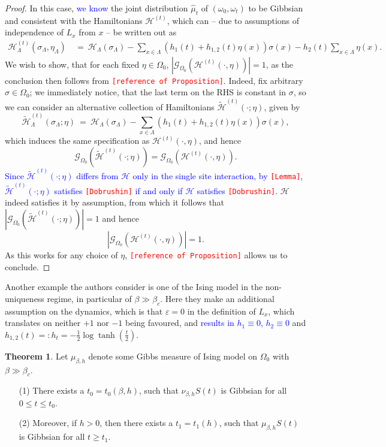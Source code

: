 \documentclass[12pt]{article}
\newcommand{\G}{\mathcal{G}}
\renewcommand{\H}{\mathcal{H}}
\newcommand{\oklepaj}[1]{\left(#1\right)}
\newcommand{\pika}{\boldsymbol{\cdot}}
\newcommand{\1}{\mathbbm{1}}
\newcommand{\5}{\vspace{0.5cm}}
\renewcommand{\tilde}{\widetilde}
\renewcommand{\hat}{\widehat}
\theoremstyle{definition}
\newtheorem{thm}{Theorem}[section]
\begin{document}
\begin{proof}
In this case, \textcolor{blue}{we know} the joint distribution $\hat{\mu}_t$ of $(\omega_0,\omega_t)$ to be Gibbsian and consistent with the Hamiltonians $\H^{(t)}$, which can -- due to assumptions of independence of $L_x$ from $x$ -- be written out as
\begin{align*}
\H_\Lambda^{(t)}(\sigma_\Lambda,\eta_\Lambda) ~&=~ \H_\Lambda(\sigma_\Lambda) - \sum_{x\in\Lambda}\oklepaj{h_1(t)+h_{1,2}(t)\eta(x)}\sigma(x) - h_2(t)\sum_{x\in\Lambda}\eta(x).
\end{align*}
We wish to show, that for each fixed $\eta\in\Omega_0$, $|\G_{\Omega_0}(\H^{(t)}(\pika,\eta))|=1$, as the conclusion then follows from \textcolor{red}{\texttt{[reference of Proposition]}}. Indeed, fix arbitrary $\sigma\in\Omega_0$; we immediately notice, that the last term on the RHS is constant in $\sigma$, so we can consider an alternative collection of Hamiltonians $\tilde{\H}^{(t)}(\pika;\eta)$, given by
$$\tilde{\H}_\Lambda^{(t)}(\sigma_\Lambda;\eta) ~=~ \H_\Lambda(\sigma_\Lambda) - \sum_{x\in\Lambda}\oklepaj{h_1(t)+h_{1,2}(t)\eta(x)}\sigma(x),$$
which induces the same specification as $\H^{(t)}(\pika,\eta)$, and hence 
$$\G_{\Omega_0}(\tilde{\H}^{(t)}(\pika;\eta))=\G_{\Omega_0}(\H^{(t)}(\pika,\eta)).$$
\textcolor{blue}{Since $\tilde{\H}^{(t)}(\pika;\eta)$ differs from $\H$ only in the single site interaction, by \textcolor{red}{\texttt{[Lemma]}}, $\tilde{\H}^{(t)}(\pika;\eta)$ satisfies \textcolor{red}{\texttt{[Dobrushin]}} if and only if $\H$ satisfies \textcolor{red}{\texttt{[Dobrushin]}}}. $\H$ indeed satisfies it by assumption, from which it follows that $|\G_{\Omega_0}(\tilde{\H}^{(t)}(\pika;\eta))|=1$ and hence 
$$|\G_{\Omega_0}(\H^{(t)}(\pika,\eta))|=1.$$
As this works for any choice of $\eta$, \textcolor{red}{\texttt{[reference of Proposition]}} allows us to conclude.
\end{proof}

Another example the authors consider is one of the Ising model in the non-uniqueness regime, in particular of $\beta\gg\beta_c$. Here they make an additional assumption on the dynamics, which is that $\varepsilon=0$ in the definition of $L_x$, which translates on neither $+1$ nor $-1$ being favoured, and \textcolor{blue}{results in $h_1\equiv 0$, $h_2\equiv 0$} and $h_{1,2}(t)=:h_t=-\frac{1}{2}\log\tanh(\frac{t}{2})$.

\begin{thm}
Let $\mu_{\beta,h}$ denote some Gibbs measure of Ising model on $\Omega_0$ with $\beta\gg\beta_c$.
\begin{itemize}
	\item[(1)] There exists a $t_0=t_0(\beta,h)$, such that $\nu_{\beta,h}S(t)$ is Gibbsian for all $0\leq t\leq t_0$.
	\item[(2)] Moreover, if $h>0$, then there exists a $t_1=t_1(h)$, such that $\mu_{\beta,h}S(t)$ is Gibbsian for all $t\geq t_1$.
\end{itemize} 
\end{thm}
\end{document}
